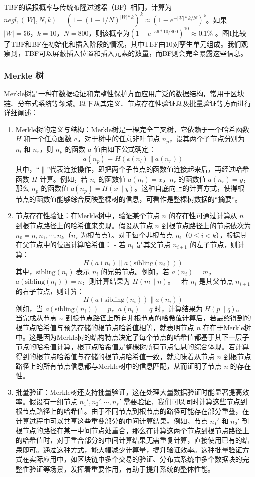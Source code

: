 \documentclass{cumcmthesis}
\numberwithin{equation}{section} %
\numberwithin{figure}{section} %
\numberwithin{table}{section} %
\begin{document}
TBF的误报概率与传统布隆过滤器（BF）相同，计算为$negl_{1}(|W|, N, k)=(1-(1 - 1/N)^{|W|*k})^{k} \approx(1 - e^{-|W|*k/N})^{k}$。如果$|W| = 56$，$k = 10$，$N = 800$，则该概率为$(1 - e^{-56*10/800})^{10} \approx 0.1\%$ 。图1比较了TBF和BF在初始化和插入阶段的情况，其中TBF由10对孪生单元组成。我们观察到，TBF可以屏蔽插入位置和插入元素的数量，而BF则会完全暴露这些信息。

\subsubsection{Merkle 树}
Merkle树是一种在数据验证和完整性保护方面应用广泛的数据结构，常用于区块链、分布式系统等领域。以下从其定义、节点存在性验证以及批量验证等方面进行详细阐述：
\begin{enumerate}
    \item Merkle树的定义与结构：Merkle树是一棵完全二叉树，它依赖于一个哈希函数 \(H\) 和一个任意函数 \(a\)。对于树中的任意非叶节点 \(n_p\)，设其两个子节点分别为 \(n_l\) 和 \(n_r\)，则 \(n_p\) 的函数 \(a\) 值由如下公式确定：
    \[a(n_p) = H(a(n_l) \| a(n_r))\]
        其中，“\(\|\)”代表连接操作，即把两个子节点的函数值连接起来后，再经过哈希函数 \(H\) 计算。例如，若 \(n_l\) 的函数值 \(a(n_l)=x\)，\(n_r\) 的函数值 \(a(n_r)=y\)，那么 \(n_p\) 的函数值 \(a(n_p)=H(x\|y)\)。这种自底向上的计算方式，使得根节点的函数值能够综合反映整棵树的信息，可看作是整棵树数据的“摘要”。
\item 节点存在性验证：在Merkle树中，验证某个节点 \(n\) 的存在性可通过计算从 \(n\) 到根节点路径上的哈希值来实现。假设从节点 \(n\) 到根节点路径上的节点依次为 \(n_0 = n, n_1, \cdots, n_k\)（\(n_k\) 为根节点）。对于每个非根节点 \(n_i\)（\(0 \leq i < k\)），根据其在父节点中的位置计算哈希值：
    - 若 \(n_i\) 是其父节点 \(n_{i + 1}\) 的左子节点，则计算：
    \[H(a(n_i) \| a(\text{sibling}(n_i)))\]
    其中，\(\text{sibling}(n_i)\) 表示 \(n_i\) 的兄弟节点。例如，若 \(a(n_i)=m\)，\(a(\text{sibling}(n_i)) = n\)，则计算结果为 \(H(m\|n)\)。
    - 若 \(n_i\) 是其父节点 \(n_{i + 1}\) 的右子节点，则计算：
    \[H(a(\text{sibling}(n_i)) \| a(n_i))\]
    例如，当 \(a(\text{sibling}(n_i)) = p\)，\(a(n_i)=q\) 时，计算结果为 \(H(p\|q)\)。
当完成从节点 \(n\) 到根节点路径上所有非根节点的哈希值计算后，若最终得到的根节点哈希值与预先存储的根节点哈希值相等，就表明节点 \(n\) 存在于Merkle树中。这是因为Merkle树的结构特点决定了每个节点的哈希值都基于其下一层子节点的哈希值计算，根节点哈希值是整棵树所有节点信息的综合体现。若计算得到的根节点哈希值与存储的根节点哈希值一致，就意味着从节点 \(n\) 到根节点路径上的所有节点信息都与Merkle树中的信息匹配，从而证明了节点 \(n\) 的存在性。
\item 批量验证：Merkle树还支持批量验证，这在处理大量数据验证时能显著提高效率。假设有一组节点 \(n_1', n_2', \cdots, n_s'\) 需要验证，我们可以同时计算这些节点到根节点路径上的哈希值。由于不同节点到根节点的路径可能存在部分重叠，在计算过程中可以共享这些重叠部分的中间计算结果。例如，节点 \(n_1'\) 和 \(n_2'\) 到根节点的路径在某一中间节点处重合，那么在计算这两个节点到根节点路径上的哈希值时，对于重合部分的中间计算结果无需重复计算，直接使用已有的结果即可。通过这种方式，能大幅减少计算量，提升验证效率。这种批量验证方式在实际应用中，如区块链中多个交易的验证、分布式系统中多个数据块的完整性验证等场景，发挥着重要作用，有助于提升系统的整体性能。 
\end{enumerate}
\end{document}
